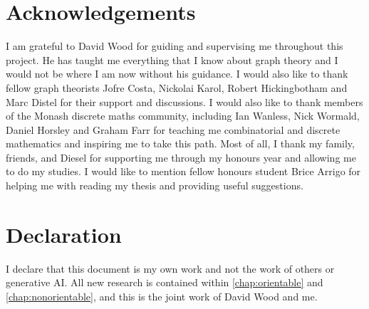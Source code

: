 \section*{Acknowledgements}
I am grateful to David Wood for guiding and supervising me throughout this project. He has taught me everything that I know about graph theory and I would not be where I am now without his guidance. I would also like to thank fellow graph theorists Jofre Costa, Nickolai Karol, Robert Hickingbotham and Marc Distel for their support and discussions. I would also like to thank members of the Monash discrete maths community, including Ian Wanless, Nick Wormald, Daniel Horsley and Graham Farr for teaching me combinatorial and discrete mathematics and inspiring me to take this path. Most of all, I thank my family, friends, and Diesel for supporting me through my honours year and allowing me to do my studies. I would like to mention fellow honours student Brice Arrigo for helping me with reading my thesis and providing useful suggestions.

\section*{Declaration}

I declare that this document is my own work and not the work of others or generative AI. All new research is contained within \cref{chap:orientable} and \cref{chap:nonorientable}, and this is the joint work of David Wood and me.